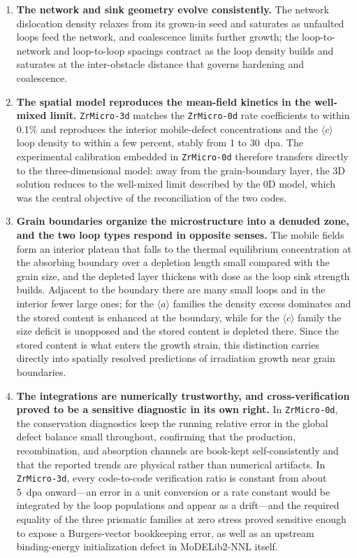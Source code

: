 \documentclass{article}
\newcommand{\aloop}{\ensuremath{\langle a\rangle}}
\newcommand{\cloop}{\ensuremath{\langle c\rangle}}
\newcommand{\ZrM}{\texttt{ZrMicro-3d}}
\newcommand{\MoD}{\textsf{MoDELib2-NNL}}
\newcommand{\ZrOd}{\texttt{ZrMicro-0d}}
\begin{document}
\begin{enumerate}
\item \textbf{The network and sink geometry evolve consistently.} The network dislocation density relaxes from its grown-in seed and saturates as unfaulted loops feed the network, and coalescence limits further growth; the loop-to-network and loop-to-loop spacings contract as the loop density builds and saturates at the inter-obstacle distance that governs hardening and coalescence.
\item \textbf{The spatial model reproduces the mean-field kinetics in the well-mixed limit.} {\ZrM} matches the {\ZrOd} rate coefficients to within 0.1\% and reproduces the interior mobile-defect concentrations and the \cloop{} loop density to within a few percent, stably from 1 to 30~dpa. The experimental calibration embedded in {\ZrOd} therefore transfers directly to the three-dimensional model: away from the grain-boundary layer, the 3D solution reduces to the well-mixed limit described by the 0D model, which was the central objective of the reconciliation of the two codes.
\item \textbf{Grain boundaries organize the microstructure into a denuded zone, and the two loop types respond in opposite senses.} The mobile fields form an interior plateau that falls to the thermal equilibrium concentration at the absorbing boundary over a depletion length small compared with the grain size, and the depleted layer thickens with dose as the loop sink strength builds. Adjacent to the boundary there are many small loops and in the interior fewer large ones; for the \aloop{} families the density excess dominates and the stored content is enhanced at the boundary, while for the \cloop{} family the size deficit is unopposed and the stored content is depleted there. Since the stored content is what enters the growth strain, this distinction carries directly into spatially resolved predictions of irradiation growth near grain boundaries.
\item \textbf{The integrations are numerically trustworthy, and cross-verification proved to be a sensitive diagnostic in its own right.} In {\ZrOd}, the conservation diagnostics keep the running relative error in the global defect balance small throughout, confirming that the production, recombination, and absorption channels are book-kept self-consistently and that the reported trends are physical rather than numerical artifacts. In {\ZrM}, every code-to-code verification ratio is constant from about 5~dpa onward---an error in a unit conversion or a rate constant would be integrated by the loop populations and appear as a drift---and the required equality of the three prismatic families at zero stress proved sensitive enough to expose a Burgers-vector bookkeeping error, as well as an upstream binding-energy initialization defect in {\MoD} itself.

\end{enumerate}
\end{document}
